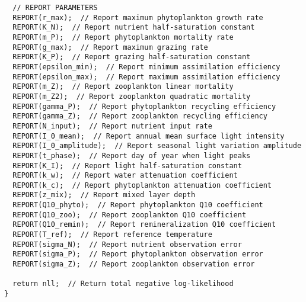 \begin{lstlisting}
  // REPORT PARAMETERS
  REPORT(r_max);  // Report maximum phytoplankton growth rate
  REPORT(K_N);  // Report nutrient half-saturation constant
  REPORT(m_P);  // Report phytoplankton mortality rate
  REPORT(g_max);  // Report maximum grazing rate
  REPORT(K_P);  // Report grazing half-saturation constant
  REPORT(epsilon_min);  // Report minimum assimilation efficiency
  REPORT(epsilon_max);  // Report maximum assimilation efficiency
  REPORT(m_Z);  // Report zooplankton linear mortality
  REPORT(m_Z2);  // Report zooplankton quadratic mortality
  REPORT(gamma_P);  // Report phytoplankton recycling efficiency
  REPORT(gamma_Z);  // Report zooplankton recycling efficiency
  REPORT(N_input);  // Report nutrient input rate
  REPORT(I_0_mean);  // Report annual mean surface light intensity
  REPORT(I_0_amplitude);  // Report seasonal light variation amplitude
  REPORT(t_phase);  // Report day of year when light peaks
  REPORT(K_I);  // Report light half-saturation constant
  REPORT(k_w);  // Report water attenuation coefficient
  REPORT(k_c);  // Report phytoplankton attenuation coefficient
  REPORT(z_mix);  // Report mixed layer depth
  REPORT(Q10_phyto);  // Report phytoplankton Q10 coefficient
  REPORT(Q10_zoo);  // Report zooplankton Q10 coefficient
  REPORT(Q10_remin);  // Report remineralization Q10 coefficient
  REPORT(T_ref);  // Report reference temperature
  REPORT(sigma_N);  // Report nutrient observation error
  REPORT(sigma_P);  // Report phytoplankton observation error
  REPORT(sigma_Z);  // Report zooplankton observation error
  
  return nll;  // Return total negative log-likelihood
}
\end{lstlisting}

